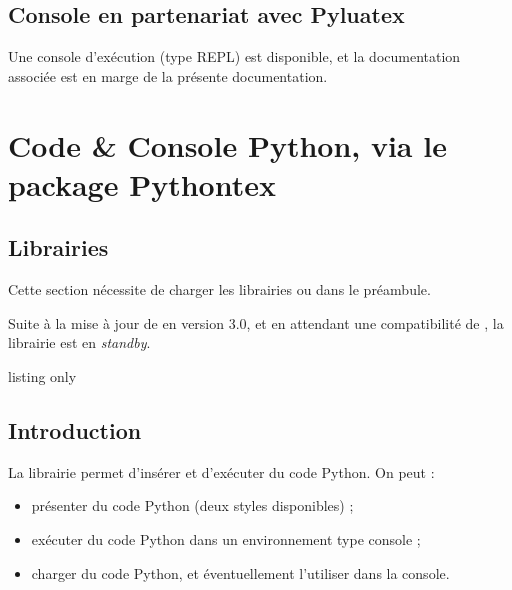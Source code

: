 \subsection{Console en partenariat avec Pyluatex}

\begin{noteblock}
 Une console d'exécution (type REPL) est disponible, et la documentation associée est en marge de la présente documentation.
\end{noteblock}

\pagebreak

\section{Code \& Console Python, via le package Pythontex}

\subsection{Librairies}

\begin{noteblock}
 Cette section nécessite de charger les librairies  ou  dans le préambule.

\smallskip

 {\small\faBomb} Suite à la mise à jour de  en version 3.0, et en attendant une compatibilité de , la librairie  est en \textit{standby}.
\end{noteblock}

\begin{PresCodeTexPL}{listing only}
\end{PresCodeTexPL}

\subsection{Introduction}

\begin{tipblock}
 La \textsf{librairie}  permet d'insérer et d'exécuter du code \textsf{Python}. On peut :

\begin{itemize}
	\item {} présenter du code \textsf{Python} (deux styles disponibles) ;
	\item exécuter du code \textsf{Python} dans un environnement type \og console \fg{} ;
	\item charger du code \textsf{Python}, et éventuellement l'utiliser dans la console.
\end{itemize}
\vspace*{-\baselineskip}\leavevmode
\end{tipblock}

